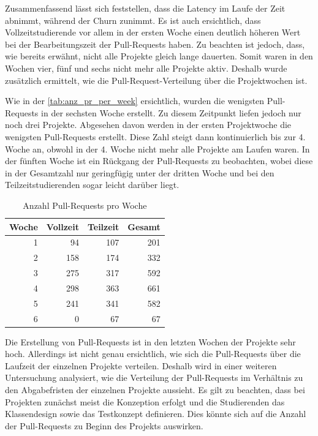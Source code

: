 \newpage
Zusammenfassend lässt sich feststellen, dass die Latency im Laufe der Zeit abnimmt, während der Churn zunimmt. Es ist auch ersichtlich, dass Vollzeitstudierende vor allem in der ersten Woche einen deutlich höheren Wert bei der Bearbeitungszeit der Pull-Requests haben. Zu beachten ist jedoch, dass, wie bereits erwähnt, nicht alle Projekte gleich lange dauerten. Somit waren in den Wochen vier, fünf und sechs nicht mehr alle Projekte aktiv. Deshalb wurde zusätzlich ermittelt, wie die Pull-Request-Verteilung über die Projektwochen ist.

Wie in der \autoref{tab:anz_pr_per_week} ersichtlich, wurden die wenigsten Pull-Requests in der sechsten Woche erstellt. Zu diesem Zeitpunkt liefen jedoch nur noch drei Projekte. Abgesehen davon werden in der ersten Projektwoche die wenigsten Pull-Requests erstellt. Diese Zahl steigt dann kontinuierlich bis zur 4. Woche an, obwohl in der 4. Woche nicht mehr alle Projekte am Laufen waren. In der fünften Woche ist ein Rückgang der Pull-Requests zu beobachten, wobei diese in der Gesamtzahl nur geringfügig unter der dritten Woche und bei den Teilzeitstudierenden sogar leicht darüber liegt. 

\begin{table}[ht]
\caption{Anzahl Pull-Requests pro Woche}
\label{tab:anz_pr_per_week}
\centering
\begin{tabular}{rrrr}
\toprule
\textbf{Woche} & \textbf{Vollzeit} & \textbf{Teilzeit} & \textbf{Gesamt} \\
\midrule
1 & 94 & 107 & 201 \\
2 & 158 & 174 & 332\\
3 & 275 & 317 & 592\\
4 & 298 & 363 & 661\\
5 & 241 & 341 & 582 \\
6 & 0 & 67 & 67\\
\bottomrule
\end{tabular}
\end{table}

Die Erstellung von Pull-Requests ist in den letzten Wochen der Projekte sehr hoch. Allerdings ist nicht genau ersichtlich, wie sich die Pull-Requests über die Laufzeit der einzelnen Projekte verteilen. Deshalb wird in einer weiteren Untersuchung analysiert, wie die Verteilung der Pull-Requests im Verhältnis zu den Abgabefristen der einzelnen Projekte aussieht. Es gilt zu beachten, dass bei Projekten zunächst meist die Konzeption erfolgt und die Studierenden das Klassendesign sowie das Testkonzept definieren. Dies könnte sich auf die Anzahl der Pull-Requests zu Beginn des Projekts auswirken.

